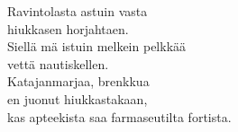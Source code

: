
Ravintolasta astuin vasta \\ hiukkasen horjahtaen. \\ Siellä mä istuin melkein pelkkää \\ vettä nautiskellen. \\ Katajanmarjaa, brenkkua \\ en juonut hiukkastakaan, \\ kas apteekista saa farmaseutilta fortista.